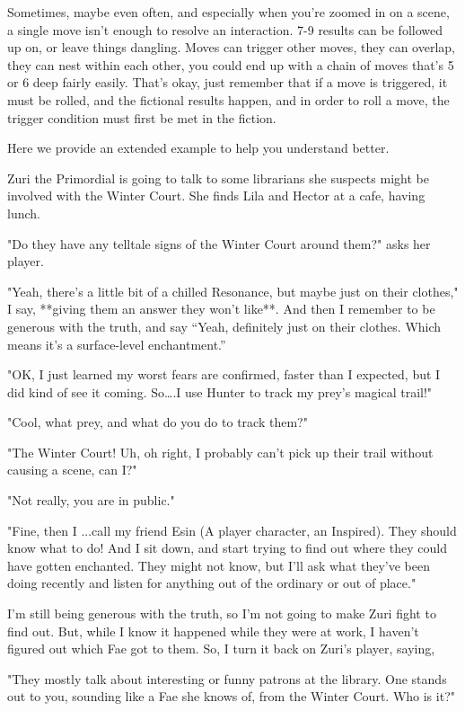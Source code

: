 \documentclass[
  oneside,
  statementpaper,
  9pt]{memoir}
\begin{document}
\begin{MC}

Sometimes, maybe even often, and especially when you’re zoomed in on a scene, a single move isn’t enough to resolve an interaction. 7-9 results can be followed up on, or leave things dangling. Moves can trigger other moves, they can overlap, they can nest within each other, you could end up with a chain of moves that’s 5 or 6 deep fairly easily. That’s okay, just remember that if a move is triggered, it must be rolled, and the fictional results happen, and in order to roll a move, the trigger condition must first be met in the fiction.

Here we provide an extended example to help you understand better.

Zuri the Primordial is going to talk to some librarians she suspects might be involved with the Winter Court. She finds Lila and Hector at a cafe, having lunch.

"Do they have any telltale signs of the Winter Court around them?" asks her player.

"Yeah, there’s a little bit of a chilled Resonance, but maybe just on their clothes," I say, **giving them an answer they won’t like**. And then I remember to be generous with the truth, and say “Yeah, definitely just on their clothes. Which means it’s a surface-level enchantment.”

"OK, I just learned my worst fears are confirmed, faster than I expected, but I did kind of see it coming. So….I use Hunter to track my prey’s magical trail!"

"Cool, what prey, and what do you do to track them?"

"The Winter Court! Uh, oh right, I probably can’t pick up their trail without causing a scene, can I?"

"Not really, you are in public."

"Fine, then I ...call my friend Esin (A player character, an Inspired). They should know what to do! And I sit down, and start trying to find out where they could have gotten enchanted. They might not know, but I’ll ask what they’ve been doing recently and listen for anything out of the ordinary or out of place."

I’m still being generous with the truth, so I’m not going to make Zuri fight to find out. But, while I know it happened while they were at work, I haven’t figured out which Fae got to them. So, I turn it back on Zuri’s player, saying,

"They mostly talk about interesting or funny patrons at the library. One stands out to you, sounding like a Fae she knows of, from the Winter Court. Who is it?"


\end{MC}
\end{document}
